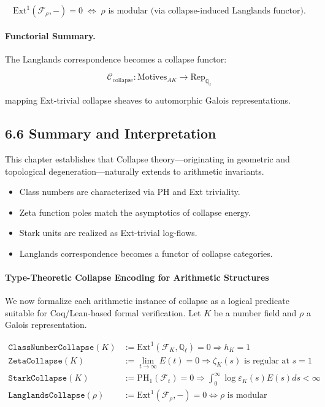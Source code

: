 \documentclass[11pt]{article}
\begin{document}
\[
\mathrm{Ext}^1(\mathcal{F}_\rho, -) = 0 \;\Leftrightarrow\; \rho \text{ is modular (via collapse-induced Langlands functor)}.
\]

\paragraph{Functorial Summary.}
The Langlands correspondence becomes a collapse functor:

\[
\mathcal{C}_{\text{collapse}}: \text{Motives}_{AK} \longrightarrow \text{Rep}_{\mathbb{Q}_\ell}
\]

mapping Ext-trivial collapse sheaves to automorphic Galois representations.

\subsection*{6.6 Summary and Interpretation}

This chapter establishes that Collapse theory—originating in geometric and topological degeneration—naturally extends to arithmetic invariants.

\begin{itemize}
  \item Class numbers are characterized via PH and Ext triviality.
  \item Zeta function poles match the asymptotics of collapse energy.
  \item Stark units are realized as Ext-trivial log-flows.
  \item Langlands correspondence becomes a functor of collapse categories.
\end{itemize}

\paragraph{Type-Theoretic Collapse Encoding for Arithmetic Structures}

We now formalize each arithmetic instance of collapse as a logical predicate  
suitable for Coq/Lean-based formal verification. Let \( K \) be a number field and \( \rho \) a Galois representation.

\begin{align*}
\texttt{ClassNumberCollapse}(K) &:= \mathrm{Ext}^1(\mathcal{F}_K, \mathbb{Q}_\ell) = 0 \Rightarrow h_K = 1 \\
\texttt{ZetaCollapse}(K) &:= \lim_{t \to \infty} E(t) = 0 \Rightarrow \zeta_K(s) \text{ is regular at } s = 1 \\
\texttt{StarkCollapse}(K) &:= \mathrm{PH}_1(\mathcal{F}_t) = 0 \Rightarrow \int_0^\infty \log \varepsilon_K(s) E(s) ds < \infty \\
\texttt{LanglandsCollapse}(\rho) &:= \mathrm{Ext}^1(\mathcal{F}_\rho, -) = 0 \Leftrightarrow \rho \text{ is modular}
\end{align*}
\end{document}
